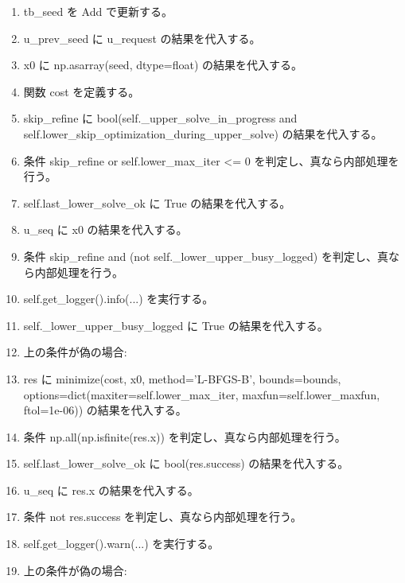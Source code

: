 \documentclass[a4paper,11pt]{article}
\begin{document}
\begin{enumerate}[leftmargin=1.8em]
\item   tb\_seed を Add で更新する。
\item   u\_prev\_seed に u\_request の結果を代入する。
\item x0 に np.asarray(seed, dtype=float) の結果を代入する。
\item 関数 cost を定義する。
\item skip\_refine に bool(self.\_upper\_solve\_in\_progress and self.lower\_skip\_optimization\_during\_upper\_solve) の結果を代入する。
\item 条件 skip\_refine or self.lower\_max\_iter <= 0 を判定し、真なら内部処理を行う。
\item   self.last\_lower\_solve\_ok に True の結果を代入する。
\item   u\_seq に x0 の結果を代入する。
\item   条件 skip\_refine and (not self.\_lower\_upper\_busy\_logged) を判定し、真なら内部処理を行う。
\item     self.get\_logger().info(...) を実行する。
\item     self.\_lower\_upper\_busy\_logged に True の結果を代入する。
\item   上の条件が偽の場合:
\item   res に minimize(cost, x0, method='L-BFGS-B', bounds=bounds, options=dict(maxiter=self.lower\_max\_iter, maxfun=self.lower\_maxfun, ftol=1e-06)) の結果を代入する。
\item   条件 np.all(np.isfinite(res.x)) を判定し、真なら内部処理を行う。
\item     self.last\_lower\_solve\_ok に bool(res.success) の結果を代入する。
\item     u\_seq に res.x の結果を代入する。
\item     条件 not res.success を判定し、真なら内部処理を行う。
\item       self.get\_logger().warn(...) を実行する。
\item     上の条件が偽の場合:
            \end{enumerate}
\end{document}
